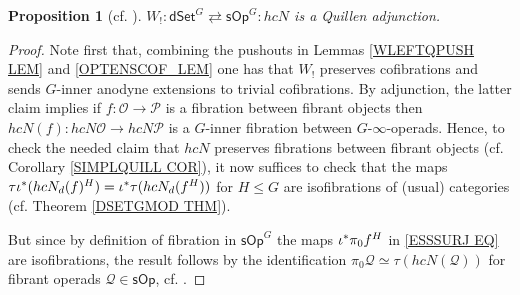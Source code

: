 \documentclass[a4paper,10pt]{article}%
\numberwithin{equation}{section}
\numberwithin{figure}{section}
\newtheorem{proposition}[equation]{Proposition}%
\theoremstyle{definition} %
\newcommand{\sOp}{\ensuremath{\mathsf{sOp}}}%
\newcommand{\dSet}{\mathsf{dSet}}
\newcommand{\1}{\ensuremath{\mathbbm 1}}%
\begin{document}
\begin{proposition}[{cf. \cite[Prop. 4.9]{CM13b}}]
      \label{W!_LEFTQ_PROP}
      $W_! \colon \dSet^G \rightleftarrows \sOp^G\colon hcN$
      is a Quillen adjunction.
\end{proposition}

\begin{proof}
	Note first that, combining the pushouts in 
	Lemmas \ref{WLEFTQPUSH LEM}
	and \ref{OPTENSCOF_LEM}
	one has that 
	$W_!$ preserves cofibrations
	and sends $G$-inner anodyne extensions to trivial cofibrations.
	By adjunction,
	the latter claim implies 
	if $f\colon \mathcal{O} \to \mathcal{P}$ is a fibration between fibrant objects
	then 
	$hcN (f)\colon hcN \mathcal{O} \to hcN\mathcal{P}$
	is a $G$-inner fibration between $G$-$\infty$-operads.
	Hence, to check the needed claim that 
	$hcN$ preserves fibrations between fibrant objects
	(cf. Corollary \ref{SIMPLQUILL COR}),
	it now suffices to check that the maps
	$\tau \iota^{\**} (h c N_d(f)^H) = \iota^{\**} \tau (h c N_d(f^H))$
	for $H \leq G$
	are isofibrations of (usual) categories
	(cf. Theorem \ref{DSETGMOD THM}).
	
	But since by definition 
	of fibration in $\mathsf{sOp}^G$
	the maps $\iota^{\**} \pi_0 f^H$ in \eqref{ESSSURJ EQ}
	are isofibrations,
	the result follows by the identification
	$\pi_0 \mathcal{Q} \simeq 
	\tau \left(h c N (\mathcal{Q}) \right)$ for fibrant operads $\mathcal{Q} \in \mathsf{sOp}$,
	cf. \cite[Prop. 4.8]{CM13b}.
\end{proof}
\end{document}
